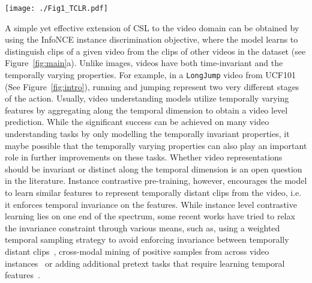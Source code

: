 \documentclass[10pt,twocolumn,letterpaper]{article}
\begin{document}
\begin{figure*}
\begin{center}
  \texttt{[image: ./Fig1\_TCLR.pdf]}
\end{center}
\vspace{-5mm}
\caption{The proposed temporal contrastive learning framework (TCLR) for learning temporally distinct video representations consists of three different losses.}

  \vspace{-5mm}

  
\label{fig:main}
\end{figure*}




A simple yet effective extension of CSL to the video domain can be obtained by using the InfoNCE instance discrimination objective, where the model learns to distinguish clips of a given video from the clips of other videos in the dataset (see Figure~\ref{fig:main}a). Unlike images, videos have both time-invariant and the temporally varying properties. For example, in a \texttt{LongJump} video from UCF101 (See Figure~\ref{fig:intro}), running and jumping represent two very different stages of the action. Usually, video understanding models utilize temporally varying features by aggregating along the temporal dimension to obtain a video level prediction. While the  significant success can be achieved on many video understanding tasks by only modelling the temporally invariant properties, it maybe possible that the temporally varying properties can also play an important role in further improvements on these tasks. Whether video representations should be invariant or distinct along the temporal dimension is an open question in the literature.  Instance contrastive pre-training, however, encourages the model to learn similar features to represent temporally distant clips from the video, i.e. it enforces temporal invariance on the features. While instance level contrastive learning lies on one end of the spectrum, some recent works have tried to relax the invariance constraint through various means, such as, using a weighted temporal sampling strategy to avoid enforcing invariance between temporally distant clips~\cite{cvrl}, cross-modal mining of positive samples from across video instances~\cite{cotraining} or adding additional pretext tasks that require learning temporal features~\cite{pace_pred, iclr21submitted_st_invariant, seco, taco}. 
\end{document}
